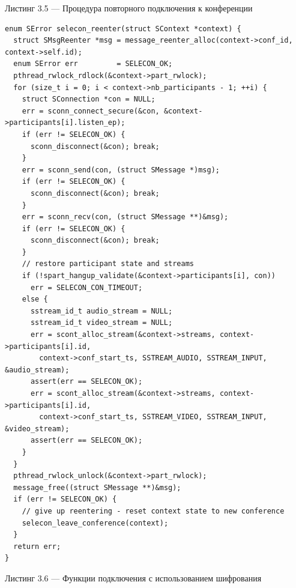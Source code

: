 Листинг 3.5 --- Процедура повторного подключения к конференции

{\fontsize{11pt}{9pt}\selectfont
\begin{verbatim}
enum SError selecon_reenter(struct SContext *context) {
  struct SMsgReenter *msg = message_reenter_alloc(context->conf_id, context->self.id);
  enum SError err         = SELECON_OK;
  pthread_rwlock_rdlock(&context->part_rwlock);
  for (size_t i = 0; i < context->nb_participants - 1; ++i) {
    struct SConnection *con = NULL;
    err = sconn_connect_secure(&con, &context->participants[i].listen_ep);
    if (err != SELECON_OK) {
      sconn_disconnect(&con); break;
    }
    err = sconn_send(con, (struct SMessage *)msg);
    if (err != SELECON_OK) {
      sconn_disconnect(&con); break;
    }
    err = sconn_recv(con, (struct SMessage **)&msg);
    if (err != SELECON_OK) {
      sconn_disconnect(&con); break;
    }
    // restore participant state and streams
    if (!spart_hangup_validate(&context->participants[i], con))
      err = SELECON_CON_TIMEOUT;
    else {
      sstream_id_t audio_stream = NULL;
      sstream_id_t video_stream = NULL;
      err = scont_alloc_stream(&context->streams, context->participants[i].id,
        context->conf_start_ts, SSTREAM_AUDIO, SSTREAM_INPUT, &audio_stream);
      assert(err == SELECON_OK);
      err = scont_alloc_stream(&context->streams, context->participants[i].id,
        context->conf_start_ts, SSTREAM_VIDEO, SSTREAM_INPUT, &video_stream);
      assert(err == SELECON_OK);
    }
  }
  pthread_rwlock_unlock(&context->part_rwlock);
  message_free((struct SMessage **)&msg);
  if (err != SELECON_OK) {
    // give up reentering - reset context state to new conference
    selecon_leave_conference(context);
  }
  return err;
}
\end{verbatim}}

Листинг 3.6 --- Функции подключения с использованием шифрования

